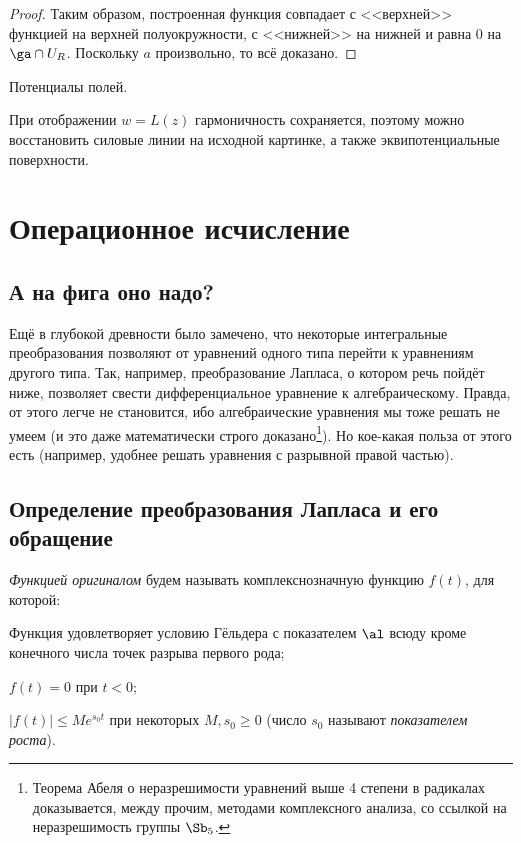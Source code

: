 \documentclass[a4paper]{article}
\begin{document}
\begin{theorem}
\begin{proof}
Таким образом,  построенная функция совпадает с <<верхней>> функцией на верхней
полуокружности,  с <<нижней>> на нижней и равна $0$ на $\ga\cap U_R$. Поскольку $a$
произвольно,  то всё доказано.
\end{proof}

\begin{ex}
Потенциалы полей.

При отображении $w=L(z)$ гармоничность сохраняется,  поэтому можно восстановить
силовые линии на исходной картинке, а также эквипотенциальные поверхности.
\end{ex}

\section{Операционное исчисление}

\subsection{А на фига оно надо?}

Ещё в глубокой древности было замечено, что некоторые интегральные преобразования позволяют от уравнений одного типа
перейти к уравнениям другого типа. Так, например, преобразование Лапласа, о котором речь пойдёт ниже, позволяет свести
дифференциальное уравнение к алгебраическому. Правда, от этого легче не становится, ибо алгебраические уравнения мы
тоже решать не умеем (и это даже математически строго доказано\footnote{Теорема Абеля о неразрешимости уравнений
выше 4 степени в радикалах доказывается, между прочим, методами комплексного анализа, со ссылкой на неразрешимость
группы $\Sb_5$.}). Но кое-какая польза от этого есть (например, удобнее решать уравнения с разрывной правой частью).

\subsection{Определение преобразования Лапласа и его обращение}

\begin{df}
\emph{Функцией оригиналом} будем называть комплекснозначную функцию $f(t)$, для которой:
\begin{points}{-1}
\item Функция удовлетворяет условию Гёльдера с показателем $\al$ всюду  кроме конечного числа точек разрыва первого рода;
\item $f(t)=0$ при $t < 0$;
\item $|f(t)| \le M e^{s_0 t}$ при некоторых $M,s_0 \ge 0$ (число $s_0$ называют \emph{показателем роста}).
\end{points}
\end{df}


\end{theorem}
\end{document}
